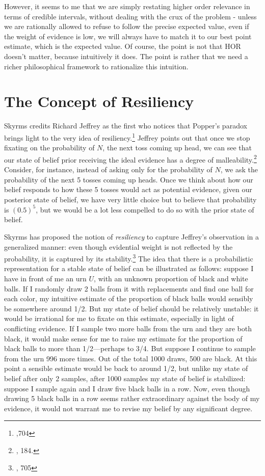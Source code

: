 However, it seems to me that we are simply restating higher order
relevance in terms of credible intervals, without dealing with the crux
of the problem - unless we are rationally allowed to refuse to follow
the precise expected value, even if the weight of evidence is low, we
will always have to match it to our best point estimate, which is the
expected value. Of course, the point is not that HOR doesn't matter,
because intuitively it does. The point is rather that we need a richer
philosophical framework to rationalize this intuition.

\hypertarget{the-concept-of-resiliency-1}{%
\section{The Concept of
Resiliency}\label{the-concept-of-resiliency-1}}

Skyrms credits Richard Jeffrey as the first who notices that Popper's
paradox brings light to the very idea of resiliency.\footnote{\cite{causationandconditional},704} Jeffrey points out
that once we stop fixating on the probability of \(N\), the next toss
coming up head, we can see that our state of belief prior receiving the
ideal evidence has a degree of malleability.\footnote{\cite{jeffreydecision}, 184.} Consider, for instance, instead of
asking only for the probability of \(N\), we ask the probability of the
next 5 tosses coming up heads. Once we think about how our belief
responds to how these 5 tosses would act as potential evidence, given
our posterior state of belief, we have very little choice but to believe
that probability is \((0.5)^5\), but we would be a lot less compelled to
do so with the prior state of belief.

Skyrms has proposed the notion of \emph{resiliency} to capture Jeffrey's
observation in a generalized manner: even though evidential weight is
not reflected by the probability, it is captured by its stability.\footnote{\cite{causationandconditional}, 705} The
idea that there is a probabilistic representation for a stable state of
belief can be illustrated as follows: suppose I have in front of me an urn
\(U\), with an unknown proportion of black and white balls. If I
randomly draw 2 balls from it with replacements and find one ball for
each color, my intuitive estimate of the proportion of black balls would
sensibly be somewhere around 1/2. But my state of belief should be
relatively unstable: it would be irrational for me to fixate on this
estimate, especially in light of conflicting evidence. If I sample two
more balls from the urn and they are both black, it would make sense for
me to raise my estimate for the proportion of black balls to more than
1/2---perhaps to 3/4. But suppose I continue to sample from the urn 996 more
times. Out of the total 1000 draws, 500 are black. At this point a
sensible estimate would be back to around 1/2, but unlike my state of belief
after only 2 samples, after 1000 samples my state of belief is
stabilized: suppose I sample again and I draw five black balls in a row.
Now, even though drawing 5 black balls in a row seems rather
extraordinary against the body of my evidence, it would not warrant me
to revise my belief by any significant degree.

